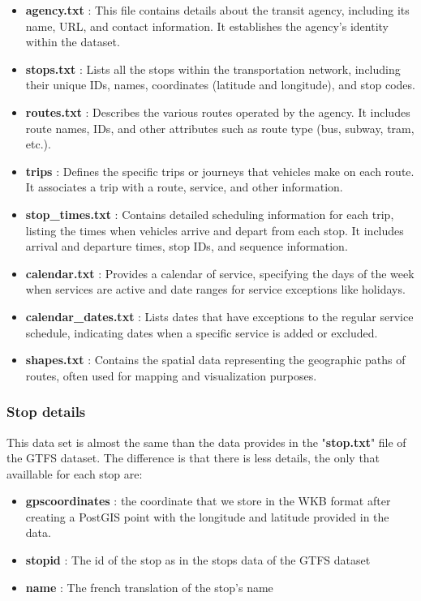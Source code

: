 \documentclass[12pt]{report}
\begin{document}
	\begin{itemize}[noitemsep]
		\item \textbf{agency.txt} : This file contains details about the transit agency, including its name, URL, and contact information. It establishes the agency's identity within the dataset. 
		\item \textbf{stops.txt} : Lists all the stops within the transportation network, including their unique IDs, names, coordinates (latitude and longitude), and stop codes.
		\item \textbf{routes.txt} : Describes the various routes operated by the agency. It includes route names, IDs, and other attributes such as route type (bus, subway, tram, etc.).
		\item \textbf{trips} : Defines the specific trips or journeys that vehicles make on each route. It associates a trip with a route, service, and other information.
		\item \textbf{stop\_times.txt} : Contains detailed scheduling information for each trip, listing the times when vehicles arrive and depart from each stop. It includes arrival and departure times, stop IDs, and sequence information.
		\item \textbf{calendar.txt} : Provides a calendar of service, specifying the days of the week when services are active and date ranges for service exceptions like holidays.
		\item \textbf{calendar\_dates.txt} : Lists dates that have exceptions to the regular service schedule, indicating dates when a specific service is added or excluded.
		\item \textbf{shapes.txt} : Contains the spatial data representing the geographic paths of routes, often used for mapping and visualization purposes.
	\end{itemize}
	
	\subsubsection{Stop details}
	
	This data set is almost the same than the data provides in the "\textbf{stop.txt}" file of the GTFS dataset. The difference is that there is less details, the only that  availlable for each  stop are: 
	
	
	
	
	\begin{itemize}[noitemsep]
		\item \textbf{gpscoordinates} : the coordinate that we store in the WKB format after creating a PostGIS point with the longitude and latitude provided in the data.
		\item \textbf{stopid} : The id of the stop as in the stops data of the GTFS dataset
		\item \textbf{name} : The french translation of the stop's name
	\end{itemize}
	 
\end{document}
